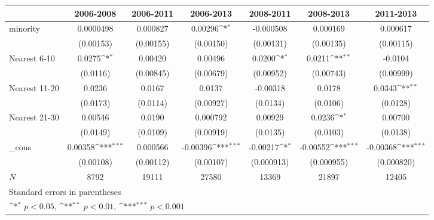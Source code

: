 {
\def\sym#1{\ifmmode^{#1}\else\(^{#1}\)\fi}
\begin{tabular}{l*{6}{c}}
\hline\hline
            &\multicolumn{1}{c}{2006-2008}&\multicolumn{1}{c}{2006-2011}&\multicolumn{1}{c}{2006-2013}&\multicolumn{1}{c}{2008-2011}&\multicolumn{1}{c}{2008-2013}&\multicolumn{1}{c}{2011-2013}\\
\hline
minority    &   0.0000498         &    0.000827         &     0.00296\sym{*}  &   -0.000508         &    0.000169         &    0.000617         \\
            &   (0.00153)         &   (0.00155)         &   (0.00150)         &   (0.00131)         &   (0.00135)         &   (0.00115)         \\
[1em]
Nearest 6-10&      0.0275\sym{*}  &     0.00420         &     0.00496         &      0.0200\sym{*}  &      0.0211\sym{**} &     -0.0104         \\
            &    (0.0116)         &   (0.00845)         &   (0.00679)         &   (0.00952)         &   (0.00743)         &   (0.00999)         \\
[1em]
Nearest 11-20&      0.0236         &      0.0167         &      0.0137         &    -0.00318         &      0.0178         &      0.0343\sym{**} \\
            &    (0.0173)         &    (0.0114)         &   (0.00927)         &    (0.0134)         &    (0.0106)         &    (0.0128)         \\
[1em]
Nearest 21-30&     0.00546         &      0.0190         &    0.000792         &     0.00929         &      0.0236\sym{*}  &     0.00700         \\
            &    (0.0149)         &    (0.0109)         &   (0.00919)         &    (0.0135)         &    (0.0103)         &    (0.0138)         \\
[1em]
\_cons      &     0.00358\sym{***}&    0.000566         &    -0.00396\sym{***}&    -0.00217\sym{*}  &    -0.00552\sym{***}&    -0.00368\sym{***}\\
            &   (0.00108)         &   (0.00112)         &   (0.00107)         &  (0.000913)         &  (0.000955)         &  (0.000820)         \\
\hline
\(N\)       &        8792         &       19111         &       27580         &       13369         &       21897         &       12405         \\
\hline\hline
\multicolumn{7}{l}{\footnotesize Standard errors in parentheses}\\
\multicolumn{7}{l}{\footnotesize \sym{*} \(p<0.05\), \sym{**} \(p<0.01\), \sym{***} \(p<0.001\)}\\
\end{tabular}
}
